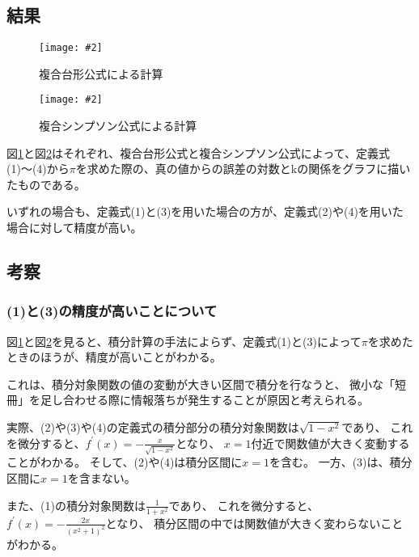 \documentclass[11pt]{jsarticle}
\newcommand{\fg}[3]{ %
    \begin{figure}
        \centering
        \texttt{[image: \#2]}
        \caption{#3}
        \label{#1}
    \end{figure}
}
\newcommand{\fr}[1]{図\ref{#1}}
\begin{document}
\subsection{結果}
\fg{fig3}{graph/4_3_trapezoidal.png}{複合台形公式による計算}
\fg{fig4}{graph/4_3_simpsons.png}{複合シンプソン公式による計算}

\fr{fig3}と\fr{fig4}はそれぞれ、複合台形公式と複合シンプソン公式によって、定義式(1)〜(4)から$\pi$を求めた際の、真の値からの誤差の対数とkの関係をグラフに描いたものである。

いずれの場合も、定義式(1)と(3)を用いた場合の方が、定義式(2)や(4)を用いた場合に対して精度が高い。

\subsection{考察}
\subsubsection{(1)と(3)の精度が高いことについて}
\fr{fig3}と\fr{fig4}を見ると、積分計算の手法によらず、定義式(1)と(3)によって$\pi$を求めたときのほうが、精度が高いことがわかる。

これは、積分対象関数の値の変動が大きい区間で積分を行なうと、
微小な「短冊」を足し合わせる際に情報落ちが発生することが原因と考えられる。

実際、(2)や(3)や(4)の定義式の積分部分の積分対象関数は$\sqrt{1 - x^2}$であり、
これを微分すると、$f^{\prime}(x) = -\frac{x}{\sqrt{1 - x^2}}$となり、
$x=1$付近で関数値が大きく変動することがわかる。
そして、(2)や(4)は積分区間に$x=1$を含む。
一方、(3)は、積分区間に$x=1$を含まない。

また、(1)の積分対象関数は$\frac{1}{1+x^2}$であり、
これを微分すると、$f^{\prime}(x) = -\frac{2x}{(x^2+1)^2}$となり、
積分区間の中では関数値が大きく変わらないことがわかる。

\end{document}
